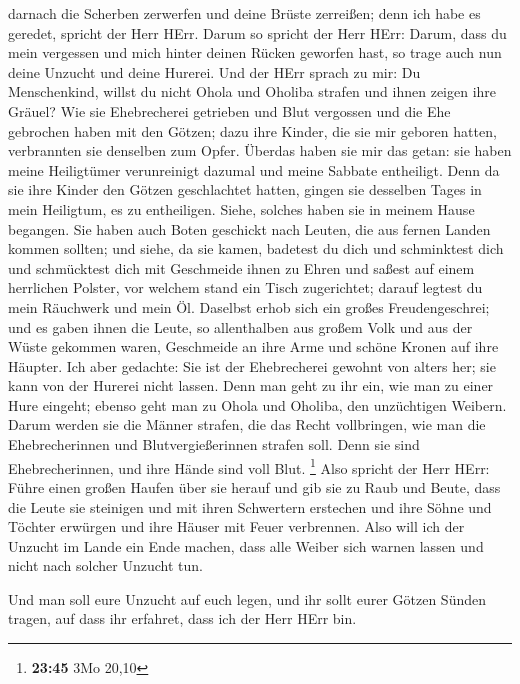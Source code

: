 darnach die Scherben zerwerfen und deine Brüste zerreißen; denn ich habe
es geredet, spricht der Herr HErr.  Darum so spricht der
Herr HErr: Darum, dass du mein vergessen und mich hinter deinen Rücken
geworfen hast, so trage auch nun deine Unzucht und deine Hurerei.
 Und der HErr sprach zu mir: Du Menschenkind, willst du
nicht Ohola und Oholiba strafen und ihnen zeigen ihre Gräuel?
 Wie sie Ehebrecherei getrieben und Blut vergossen und
die Ehe gebrochen haben mit den Götzen; dazu ihre Kinder, die sie mir
geboren hatten, verbrannten sie denselben zum Opfer. 
Überdas haben sie mir das getan: sie haben meine Heiligtümer
verunreinigt dazumal und meine Sabbate entheiligt.  Denn
da sie ihre Kinder den Götzen geschlachtet hatten, gingen sie desselben
Tages in mein Heiligtum, es zu entheiligen. Siehe, solches haben sie in
meinem Hause begangen.  Sie haben auch Boten geschickt
nach Leuten, die aus fernen Landen kommen sollten; und siehe, da sie
kamen, badetest du dich und schminktest dich und schmücktest dich mit
Geschmeide ihnen zu Ehren  und saßest auf einem
herrlichen Polster, vor welchem stand ein Tisch zugerichtet; darauf
legtest du mein Räuchwerk und mein Öl.  Daselbst erhob
sich ein großes Freudengeschrei; und es gaben ihnen die Leute, so
allenthalben aus großem Volk und aus der Wüste gekommen waren,
Geschmeide an ihre Arme und schöne Kronen auf ihre Häupter.
 Ich aber gedachte: Sie ist der Ehebrecherei gewohnt von
alters her; sie kann von der Hurerei nicht lassen.  Denn
man geht zu ihr ein, wie man zu einer Hure eingeht; ebenso geht man zu
Ohola und Oholiba, den unzüchtigen Weibern.  Darum werden
sie die Männer strafen, die das Recht vollbringen, wie man die
Ehebrecherinnen und Blutvergießerinnen strafen soll. Denn sie sind
Ehebrecherinnen, und ihre Hände sind voll Blut. \footnote{\textbf{23:45}
  3Mo 20,10}  Also spricht der Herr HErr: Führe einen
großen Haufen über sie herauf und gib sie zu Raub und Beute,
 dass die Leute sie steinigen und mit ihren Schwertern
erstechen und ihre Söhne und Töchter erwürgen und ihre Häuser mit Feuer
verbrennen.  Also will ich der Unzucht im Lande ein Ende
machen, dass alle Weiber sich warnen lassen und nicht nach solcher
Unzucht tun.

 Und man soll eure Unzucht auf euch legen, und ihr sollt
eurer Götzen Sünden tragen, auf dass ihr erfahret, dass ich der Herr
HErr bin.

